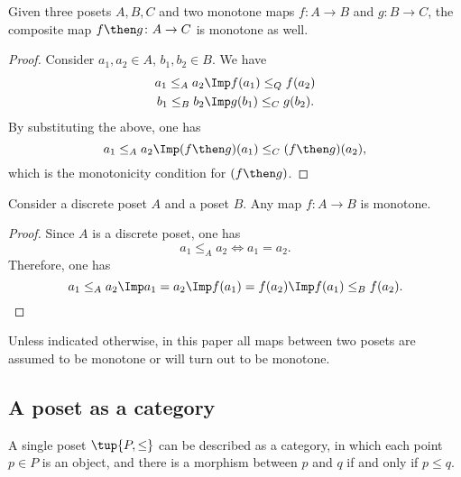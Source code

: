 \begin{lemma}Given three posets $A, B, C$ and two monotone maps $f\colon A
\to B$ and  $g\colon B \to C$, the composite map $f\then g\colon  A \to C$ is
monotone as well.
\end{lemma}
\begin{proof}
Consider $a_1,a_2 \in A$, $b_1,b_2\in B$. We have 
\begin{equation}
\begin{aligned}
        a_1\leq_A a_2 &\Imp f(a_1)\leq_Q f(a_2)\\ 
        b_1\leq_B b_2 &\Imp g(b_1)\leq_C g(b_2).
\end{aligned}
\end{equation}
By substituting the above, one has
\begin{equation}
    a_1\leq_A a_2 \Imp (f\then g)(a_1) \leq_C (f\then g)(a_2),
\end{equation}
which is the monotonicity condition for $(f\then g)$.
\end{proof}

\begin{lemma}
Consider a discrete poset $A$ and a poset $B$. Any map $f\colon A\to B$ is monotone.
\end{lemma}
\begin{proof}
Since $A$ is a discrete poset, one has
\begin{equation}
    a_1\leq_A a_2 \iff a_1=a_2.
\end{equation}
Therefore, one has
\begin{equation}
    a_1\leq_A a_2 \Imp a_1=a_2 \Imp f(a_1)=f(a_2) \Imp f(a_1)\leq_B f(a_2).
\end{equation}
\end{proof}
Unless indicated otherwise, in this paper all maps between two posets
are assumed to be monotone or will turn out to be monotone.

\subsection{A poset as a category}


A single poset $\tup{P, \leq}$ can be described as a category, in which
each point $p\in P$ is an object, and there is a morphism between
$p$ and $q$ if and only if $p \leq q$.

\begin{figure}[h!]
   \centering
   \caption{\label{fig:poset-as-category}}
\end{figure}

